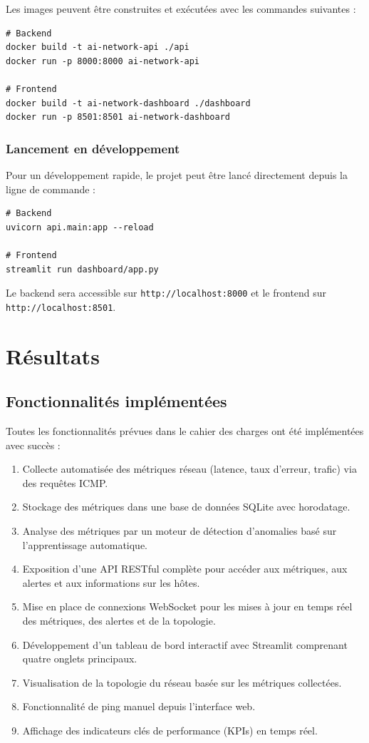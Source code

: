 \documentclass[12pt,a4paper]{report}
\begin{document}
Les images peuvent être construites et exécutées avec les commandes suivantes :
\begin{verbatim}
# Backend
docker build -t ai-network-api ./api
docker run -p 8000:8000 ai-network-api

# Frontend
docker build -t ai-network-dashboard ./dashboard
docker run -p 8501:8501 ai-network-dashboard
\end{verbatim}

\subsection{Lancement en développement}
Pour un développement rapide, le projet peut être lancé directement depuis la ligne de commande :
\begin{verbatim}
# Backend
uvicorn api.main:app --reload

# Frontend
streamlit run dashboard/app.py
\end{verbatim}

Le backend sera accessible sur \texttt{http://localhost:8000} et le frontend sur \texttt{http://localhost:8501}.

\chapter{Résultats}
\section{Fonctionnalités implémentées}
Toutes les fonctionnalités prévues dans le cahier des charges ont été implémentées avec succès :
\begin{enumerate}
    \item Collecte automatisée des métriques réseau (latence, taux d'erreur, trafic) via des requêtes ICMP.
    \item Stockage des métriques dans une base de données SQLite avec horodatage.
    \item Analyse des métriques par un moteur de détection d'anomalies basé sur l'apprentissage automatique.
    \item Exposition d'une API RESTful complète pour accéder aux métriques, aux alertes et aux informations sur les hôtes.
    \item Mise en place de connexions WebSocket pour les mises à jour en temps réel des métriques, des alertes et de la topologie.
    \item Développement d'un tableau de bord interactif avec Streamlit comprenant quatre onglets principaux.
    \item Visualisation de la topologie du réseau basée sur les métriques collectées.
    \item Fonctionnalité de ping manuel depuis l'interface web.
    \item Affichage des indicateurs clés de performance (KPIs) en temps réel.
\end{enumerate}
\end{document}
